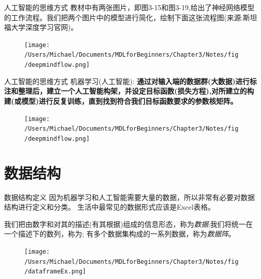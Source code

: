 \documentclass[handout]{beamer}
\begin{document}
\begin{frame}{人工智能的思维方式}
教材中有两张图片，即图3-15和图3-19,给出了神经网络模型的工作流程。我们把两个图片中的模型进行简化，绘制下面这张流程图(来源:斯坦福大学深度学习官网)。
\begin{figure}[H]
	\centering
	\texttt{[image: /Users/Michael/Documents/MDLforBeginners/Chapter3/Notes/fig/deepmindflow.png]}
\end{figure}
\end{frame}

\begin{frame}{人工智能的思维方式}
机器学习(人工智能): \textbf{通过对输入端的数据群(大数据)进行标注和整理后，建立一个人工智能构架，并设定目标函数(损失方程),对所建立的构建(或模型)进行反复训练，直到找到符合我们目标函数要求的参数核矩阵。}
\begin{figure}[H]
	\centering
	\texttt{[image: /Users/Michael/Documents/MDLforBeginners/Chapter3/Notes/fig/deepmindflow.png]}
\end{figure}
\end{frame}


\section{数据结构}



\begin{frame}{数据结构定义}
	因为机器学习和人工智能需要大量的数据，所以非常有必要对数据结构进行定义和分类。 生活中最常见的数据形式应该是Excel表格。
	\begin{definition}
	我们把由数字和对其的描述(有其根据)组成的信息形态，称为\textit{数据};我们将统一在一个描述下的数列，称为; 有多个数据集构成的一系列数据，称为\textit{数据阵}。
\end{definition}
\begin{figure}[H]
	\centering
	\texttt{[image: /Users/Michael/Documents/MDLforBeginners/Chapter3/Notes/fig/dataframeEx.png]}
\end{figure}
\end{frame}
\end{document}
